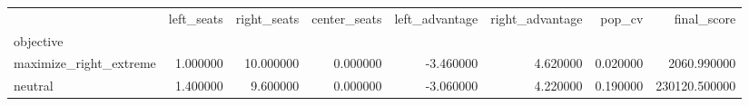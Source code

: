 \begin{tabular}{lrrrrrrr}
\toprule
 & left_seats & right_seats & center_seats & left_advantage & right_advantage & pop_cv & final_score \\
objective &  &  &  &  &  &  &  \\
\midrule
maximize_right_extreme & 1.000000 & 10.000000 & 0.000000 & -3.460000 & 4.620000 & 0.020000 & 2060.990000 \\
neutral & 1.400000 & 9.600000 & 0.000000 & -3.060000 & 4.220000 & 0.190000 & 230120.500000 \\
\bottomrule
\end{tabular}
